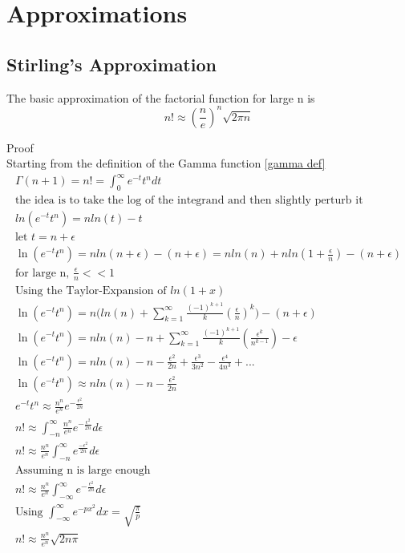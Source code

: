 \documentclass[a4paper]{article}
\begin{document}
\pagebreak
\section{Approximations}
\subsection{Stirling's Approximation}
\begin{theorem}
The basic approximation of the factorial function for large n is
\begin{equation}
\boxed{
n! \approx (\frac{n}{e})^n \sqrt{2\pi n}
}
\end{equation}

Proof
\\
Starting from the definition of the Gamma function \ref{gamma def}
\begin{gather*}
\Gamma(n+1) = n! = \int_{0}^{\infty} e^{-t} t^{n} dt 
\\
\text{the idea is to take the log of the integrand and then slightly perturb it}
\\
ln(e^{-t} t^{n}) = n ln(t) - t
\\
\text{let $t=n + \epsilon$} 
\\
\ln(e^{-t} t^{n}) = n ln(n + \epsilon) - (n + \epsilon)
=
n ln(n) + n ln(1 + \frac{\epsilon}{n}) - (n + \epsilon)
\\
\text{for large n, $\frac{\epsilon}{n} << 1$}
\\
\text{Using the Taylor-Expansion of $ln(1+x)$}
\\
\ln(e^{-t} t^{n})
= 
n \Big( ln(n) +  \sum_{k=1}^{\infty} \frac{(-1)^{k+1}}{k} (\frac{\epsilon}{n})^k \Big) - (n + \epsilon)
\\
\ln(e^{-t} t^{n})
= 
n ln(n) -n + \sum_{k=1}^{\infty} \frac{(-1)^{k+1}}{k} (\frac{\epsilon^k}{n^{k-1}}) - \epsilon
\\
\ln(e^{-t} t^{n})
= 
n ln(n) - n - \frac{\epsilon^2}{2n} + \frac{\epsilon^3}{3n^2}
- \frac{\epsilon^4}{4n^3} + ...
\\
\ln(e^{-t} t^{n})
\approx
n ln(n) - n - \frac{\epsilon^2}{2n}
\\
e^{-t} t^{n}
\approx
\frac{n^n}{e^n} e^{-\frac{\epsilon^2}{2n}}
\\
n! 
\approx
\int_{-n}^{\infty} \frac{n^n}{e^n} e^{-\frac{\epsilon^2}{2n}} d\epsilon 
\\
n! 
\approx
\frac{n^n}{e^n}
\int_{-n}^{\infty}  e^{\frac{-\epsilon^2}{2n}} d\epsilon
\\
\text{Assuming n is large enough}
\\
n! 
\approx
\frac{n^n}{e^n}
\int_{-\infty}^{\infty}  e^{-\frac{\epsilon^2}{2n}} d\epsilon
\\
\text{Using $\int_{-\infty}^{\infty}  e^{-px^2} dx = \sqrt{\frac{\pi}{p}}$}
\\
n! 
\approx
\frac{n^n}{e^n} \sqrt{2n \pi}
\end{gather*}
\end{theorem}
\end{document}
